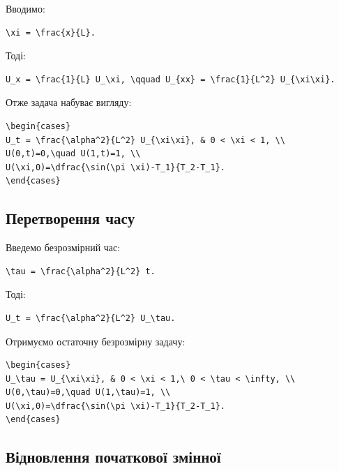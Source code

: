 \documentclass[
  ukrainian,
]{article}
\begin{document}
Вводимо:

\begin{verbatim}
\xi = \frac{x}{L}.
\end{verbatim}

Тоді:

\begin{verbatim}
U_x = \frac{1}{L} U_\xi, \qquad U_{xx} = \frac{1}{L^2} U_{\xi\xi}.
\end{verbatim}

Отже задача набуває вигляду:

\begin{verbatim}
\begin{cases}
U_t = \frac{\alpha^2}{L^2} U_{\xi\xi}, & 0 < \xi < 1, \\
U(0,t)=0,\quad U(1,t)=1, \\
U(\xi,0)=\dfrac{\sin(\pi \xi)-T_1}{T_2-T_1}.
\end{cases}
\end{verbatim}

\subsection{Перетворення
часу}\label{ux43fux435ux440ux435ux442ux432ux43eux440ux435ux43dux43dux44f-ux447ux430ux441ux443}

Введемо безрозмірний час:

\begin{verbatim}
\tau = \frac{\alpha^2}{L^2} t.
\end{verbatim}

Тоді:

\begin{verbatim}
U_t = \frac{\alpha^2}{L^2} U_\tau.
\end{verbatim}

Отримуємо остаточну безрозмірну задачу:

\begin{verbatim}
\begin{cases}
U_\tau = U_{\xi\xi}, & 0 < \xi < 1,\ 0 < \tau < \infty, \\
U(0,\tau)=0,\quad U(1,\tau)=1, \\
U(\xi,0)=\dfrac{\sin(\pi \xi)-T_1}{T_2-T_1}.
\end{cases}
\end{verbatim}

\subsection{Відновлення початкової
змінної}\label{ux432ux456ux434ux43dux43eux432ux43bux435ux43dux43dux44f-ux43fux43eux447ux430ux442ux43aux43eux432ux43eux457-ux437ux43cux456ux43dux43dux43eux457}
\end{document}
